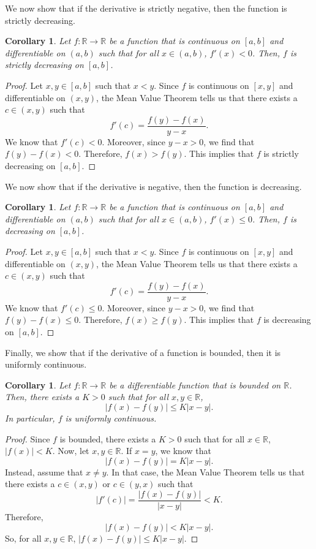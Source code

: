 \documentclass[a4paper, openany]{memoir}
\theoremstyle{definition}
\theoremstyle{plain}
\newtheorem{corollary}[definition]{Corollary}
\begin{document}
\noindent We now show that if the derivative is strictly negative, then the function is strictly decreasing.
\begin{corollary}
Let $f: \mathbb{R} \to \mathbb{R}$ be a function that is continuous on $[a, b]$ and differentiable on $(a, b)$ such that for all $x \in (a, b)$, $f'(x) < 0$. Then, $f$ is strictly decreasing on $[a, b]$.
\end{corollary}
\begin{proof}
Let $x, y \in [a, b]$ such that $x < y$. Since $f$ is continuous on $[x, y]$ and differentiable on $(x, y)$, the Mean Value Theorem tells us that there exists a $c \in (x, y)$ such that
\[f'(c) = \frac{f(y) - f(x)}{y - x}.\]
We know that $f'(c) < 0$. Moreover, since $y - x > 0$, we find that $f(y) - f(x) < 0$. Therefore, $f(x) > f(y)$. This implies that $f$ is strictly decreasing on $[a, b]$.
\end{proof}
\noindent We now show that if the derivative is negative, then the function is decreasing.
\begin{corollary}
Let $f: \mathbb{R} \to \mathbb{R}$ be a function that is continuous on $[a, b]$ and differentiable on $(a, b)$ such that for all $x \in (a, b)$, $f'(x) \leqslant 0$. Then, $f$ is decreasing on $[a, b]$.
\end{corollary}
\begin{proof}
Let $x, y \in [a, b]$ such that $x < y$. Since $f$ is continuous on $[x, y]$ and differentiable on $(x, y)$, the Mean Value Theorem tells us that there exists a $c \in (x, y)$ such that
\[f'(c) = \frac{f(y) - f(x)}{y - x}.\]
We know that $f'(c) \leqslant 0$. Moreover, since $y - x > 0$, we find that $f(y) - f(x) \leqslant 0$. Therefore, $f(x) \geqslant f(y)$. This implies that $f$ is decreasing on $[a, b]$.
\end{proof}
\noindent Finally, we show that if the derivative of a function is bounded, then it is uniformly continuous.
\begin{corollary}
Let $f: \mathbb{R} \to \mathbb{R}$ be a differentiable function that is bounded on $\mathbb{R}$. Then, there exists a $K > 0$ such that for all $x, y \in \mathbb{R}$,
\[|f(x) - f(y)| \leqslant K|x - y|.\]
In particular, $f$ is uniformly continuous.
\end{corollary}
\begin{proof}
Since $f$ is bounded, there exists a $K > 0$ such that for all $x \in \mathbb{R}$, $|f(x)| < K$. Now, let $x, y \in \mathbb{R}$. If $x = y$, we know that
\[|f(x) - f(y)| = K|x - y|.\]
Instead, assume that $x \neq y$. In that case, the Mean Value Theorem tells us that there exists a $c \in (x, y)$ or $c \in (y, x)$ such that
\[|f'(c)| = \frac{|f(x) - f(y)|}{|x - y|} < K.\]
Therefore,
\[|f(x) - f(y)| < K|x - y|.\]
So, for all $x, y \in \mathbb{R}$, $|f(x) - f(y)| \leqslant K|x - y|$.
\end{proof}
\end{document}
